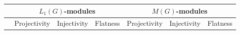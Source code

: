 \begin{scriptsize}
\begin{longtable}{|c|c|c|c|c|c|c|}
\hline            & \multicolumn{3}{c|}{$L_1(G)$-modules}                                                                                                                                                                                                                                                                                                                                                                                                                                                                      & \multicolumn{3}{c|}{$M(G)$-modules}                                                                                                                                                                                                                                                                                                                                                                                                                                                                  \\
\hline
                  & \mbox{Projectivity}                                                                                                                                               & \mbox{Injectivity}                                                                                                                                                & \mbox{Flatness}                                                                                                                                                    & \mbox{Projectivity}                                                                                                                                               & \mbox{Injectivity}                                                                                                                                                & \mbox{Flatness}                                                                                                                                                   \\ 
\hline

\end{longtable}
\end{scriptsize}
